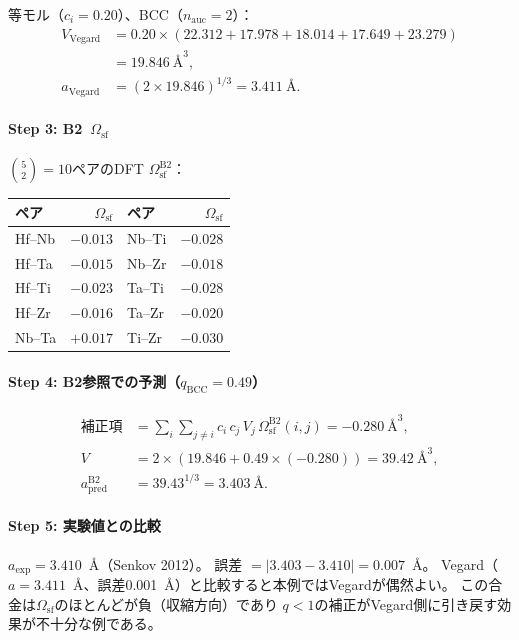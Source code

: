 \documentclass[5p,10pt]{elsarticle}
\begin{document}
等モル（$c_i = 0.20$）、BCC（$n_\text{auc} = 2$）：
\begin{align}
V_\text{Vegard} &= 0.20 \times (22.312 + 17.978 + 18.014 + 17.649 + 23.279) \nonumber \\
&= 19.846~\text{\AA}^3, \nonumber \\
a_\text{Vegard} &= (2 \times 19.846)^{1/3} = 3.411~\text{\AA}. \label{eq:ex_vegard_bcc}
\end{align}

\paragraph{Step 3: B2~$\Omega_\text{sf}$}

$\binom{5}{2} = 10$ペアのDFT $\Omega_\text{sf}^\text{B2}$：
\begin{center}
\footnotesize
\begin{tabular}{@{}lrlr@{}}
\toprule
ペア & $\Omega_\text{sf}$ & ペア & $\Omega_\text{sf}$ \\
\midrule
Hf--Nb & $-0.013$ & Nb--Ti & $-0.028$ \\
Hf--Ta & $-0.015$ & Nb--Zr & $-0.018$ \\
Hf--Ti & $-0.023$ & Ta--Ti & $-0.028$ \\
Hf--Zr & $-0.016$ & Ta--Zr & $-0.020$ \\
Nb--Ta & $+0.017$ & Ti--Zr & $-0.030$ \\
\bottomrule
\end{tabular}
\end{center}

\paragraph{Step 4: B2参照での予測（$q_\text{BCC} = 0.49$）}
\begin{align}
\text{補正項} &= \sum_i \sum_{j \ne i} c_i\,c_j\,V_j\,\Omega_\text{sf}^\text{B2}(i,j)
= -0.280~\text{\AA}^3, \nonumber \\
V &= 2 \times (19.846 + 0.49 \times (-0.280)) = 39.42~\text{\AA}^3, \nonumber \\
a_\text{pred}^{\text{B2}} &= 39.43^{1/3} = 3.403~\text{\AA}. \label{eq:ex_pred_bcc}
\end{align}

\paragraph{Step 5: 実験値との比較}

$a_\text{exp} = 3.410$~\AA{}（Senkov 2012）。
誤差 $= |3.403 - 3.410| = 0.007$~\AA。
Vegard（$a = 3.411$~\AA、誤差0.001~\AA）と比較すると本例ではVegardが偶然よい。
この合金は$\Omega_\text{sf}$のほとんどが負（収縮方向）であり
$q < 1$の補正がVegard側に引き戻す効果が不十分な例である。
\end{document}
